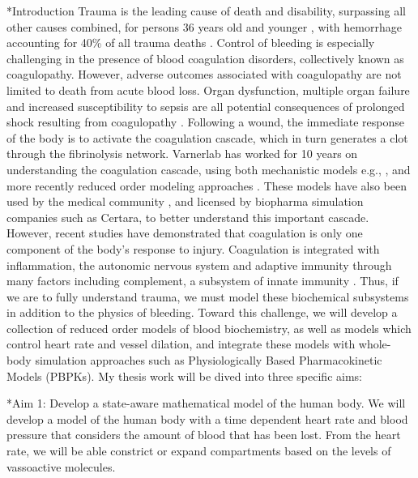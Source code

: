 \documentclass[11pt]{article}
\makeatletter
\renewcommand\subsubsection{\@startsection
	{subsubsection}{2}{0mm}
	{-0.05in}
	{-0.5\baselineskip}
	{\normalfont\normalsize\bfseries}}
\renewcommand\section{\@startsection
	{subsection}{2}{0mm}
	{-0.2in}
	{0.05\baselineskip}
	{\normalfont\large\bfseries}}
\makeatother
\begin{document}
\section*{Introduction}
Trauma is the leading cause of death and disability, surpassing all other causes combined, for persons 36 years old and younger \cite{Krug:2000aa}, with hemorrhage accounting for 40\% of all trauma deaths \cite{Sauaia:1995aa}. Control of bleeding is especially challenging in the presence of blood coagulation disorders, collectively known as coagulopathy. However, adverse outcomes associated with coagulopathy are not limited to death from acute blood loss.
Organ dysfunction, multiple organ failure and increased susceptibility to sepsis \cite{Esmon:2005aa}
are all potential consequences of prolonged shock resulting from coagulopathy \cite{Sauaia:1994aa}.
Following a wound, the immediate response of the body is to activate the coagulation cascade, which in turn generates a clot through the fibrinolysis network.
Varnerlab has worked for 10 years on understanding the coagulation cascade,
using both mechanistic models e.g., \cite{Luan:2007aa,Luan:2010aa}, and more recently reduced order modeling approaches \cite{pr3010178}.
These models have also been used by the medical community \cite{Szlam:2010aa,Rice:2016aa}, and licensed by  biopharma simulation companies such as Certara, to better understand this important cascade. However, recent studies have demonstrated that coagulation is only one component of the body's response to injury.
Coagulation is integrated with inflammation, the autonomic nervous system and adaptive immunity through many factors including complement, a subsystem of innate immunity \cite{Rittirsch:2008aa}. Thus, if we are to fully understand trauma, we must model these biochemical subsystems in addition to the physics of bleeding.
Toward this challenge, we will develop a collection of reduced order models of blood biochemistry,
as well as models which control heart rate and vessel dilation, and integrate these models with whole-body simulation approaches such as Physiologically Based Pharmacokinetic Models (PBPKs).
My thesis work will be dived into three specific aims:

\subsubsection*{Aim 1: Develop a state-aware mathematical model of the human body.} We will develop a model of the human body with a time dependent heart rate and blood pressure that considers the amount of blood that has been lost. From the heart rate, we will be able constrict or expand compartments based on the levels of vassoactive molecules. 
\end{document}
